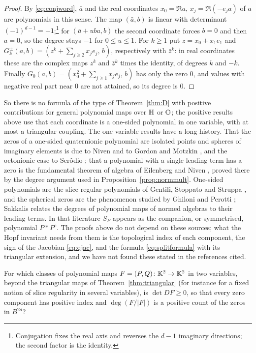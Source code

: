 \begin{proof}
By \eqref{eq:conjword}, $\bar a$ and the real coordinates $x_0=\Re a$, $x_j=\Re(-e_ja)$ of $a$ are polynomials in this sense. The map $(\bar a,b)$ is linear with determinant $(-1)^{d-1}=-1$;\footnote{Conjugation fixes the real axis and reverses the $d-1$ imaginary directions; the second factor is the identity.} for $(\bar a+uba,b)$ the second coordinate forces $b=0$ and then $a=0$, so the degree stays $-1$ for $0\le u\le1$. For $k\ge1$ put $z=x_0+x_1e_1$ and $G^\pm_k(a,b)=(z^k+\sum_{j\ge2}x_je_j,\,b)$, respectively with $\bar z^k$: in real coordinates these are the complex maps $z^k$ and $\bar z^k$ times the identity, of degrees $k$ and $-k$. Finally $G_0(a,b)=(x_0^2+\sum_{j\ge1}x_je_j,\,b)$ has only the zero $0$, and values with negative real part near $0$ are not attained, so its degree is $0$.
\end{proof}

So there is no formula of the type of Theorem~\ref{thm:D} with positive contributions for general polynomial maps over $\mathbb{H}$ or $\mathbb{O}$; the positive results above use that each coordinate is a one-sided polynomial in one variable, with at most a triangular coupling. The one-variable results have a long history. That the zeros of a one-sided quaternionic polynomial are isolated points and spheres of imaginary elements is due to Niven \cite{Niv41} and to Gordon and Motzkin \cite{GM65}, and the octonionic case to Ser\^odio \cite{Ser07}; that a polynomial with a single leading term has a zero is the fundamental theorem of algebra of Eilenberg and Niven \cite{EN44}, proved there by the degree argument used in Proposition~\ref{prop:normmult}. One-sided polynomials are the slice regular polynomials of Gentili, Stoppato and Struppa \cite{GSS13}, and the spherical zeros are the phenomenon studied by Ghiloni and Perotti \cite{GP11}; Sakkalis \cite{Sak20} relates the degrees of polynomial maps of normed algebras to their leading terms. In that literature $S_P$ appears as the companion, or symmetrised, polynomial $P*P^c$. The proofs above do not depend on these sources; what the Hopf invariant needs from them is the topological index of each component, the sign of the Jacobian \eqref{eq:qjac}, and the formula \eqref{eq:splitformula} with its triangular extension, and we have not found these stated in the references cited.

\begin{question}\label{q:quaternionic}
For which classes of polynomial maps $F=(P,Q)\colon\mathbb{K}^2\to\mathbb{K}^2$ in two variables, beyond the triangular maps of Theorem~\ref{thm:triangular} (for instance for a fixed notion of slice regularity in several variables), is $\det DF\ge0$, so that every zero component has positive index and $\deg(F/|F|)$ is a positive count of the zeros in $B^{2d}$?
\end{question}
